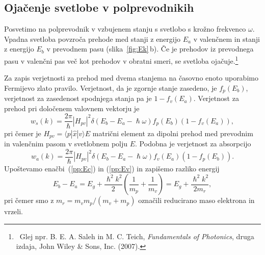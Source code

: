 \subsection*{Ojačenje svetlobe v polprevodnikih}
Posvetimo na polprevodnik v vzbujenem stanju s svetlobo s krožno frekvenco $\omega$.
Vpadna svetloba povzroča prehode med stanji z energijo $E_a$ v valenčnem 
in stanji z energijo $E_b$ v prevodnem pasu (slika~\ref{fig:Ek}\,b).
Če je prehodov iz prevodnega pasu v valenčni pas več kot prehodov v obratni
smeri, se svetloba ojačuje.\footnote{~Glej npr. 
B. E. A. Saleh in M. C. Teich, 
{\it Fundamentals of Photonics}, druga izdaja, John Wiley \& Sons, Inc. (2007).}

Za zapis verjetnosti za prehod med dvema stanjema na časovno
enoto uporabimo Fermijevo zlato pravilo. Verjetnost, da je zgornje stanje zasedeno, je 
$f_p(E_b)$, verjetnost za zasedenost spodnjega stanja pa je $1-f_v(E_a)$. Verjetnost 
za prehod pri določenem valovnem vektorju je
\begin{equation}  
w_s(k)=\frac{2\pi}{\hslash}|H_{pv}|^2\delta(E_b-E_a- \hslash\omega)
f_p(E_b)\left(1-f_v(E_a)\right)\!,
\label{6.5}
\end{equation}
pri čemer je $H_{pv}= \langle p| \hat{x}|v\rangle E $ matrični element za dipolni
prehod  med prevodnim in valenčnim pasom v svetlobnem polju $E$. Podobna je
verjetnost za absorpcijo 
\begin{equation}  
w_a(k)=\frac{2\pi}{\hslash}|H_{pv}|^2\delta(E_b-E_a- \hslash\omega)
f_v(E_a)\left(1-f_p(E_b)\right)\!.
\label{6.6}
\end{equation}
Upoštevamo enačbi~(\ref{pp:Ec}) in (\ref{pp:Ev}) in zapišemo razliko energij
\begin{equation}  
E_b-E_a= E_g + \frac{\hslash^2 k^2}{2}(\frac{1}{m_p}+ \frac{1}{m_v})= E_g + \frac{\hslash^2 k^2}{2m_r},
\label{6.8}
\end{equation}
pri čemer smo z $m_r=m_v m_p/(m_v+m_p)$ označili reducirano maso elektrona in vrzeli.

